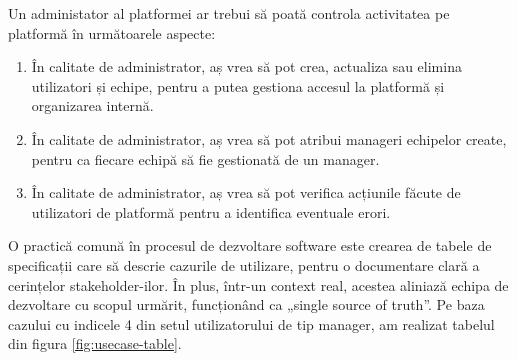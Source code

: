Un administator al platformei ar trebui să poată controla activitatea pe platformă în următoarele aspecte:
\begin{enumerate}
 	 \item  În calitate de administrator, aș vrea să pot crea, actualiza sau elimina utilizatori și echipe, pentru a putea gestiona accesul la platformă și organizarea internă.

 	 \item În calitate de administrator, aș vrea să pot atribui manageri echipelor create, pentru ca fiecare echipă să fie gestionată de un manager.

 	\item În calitate de administrator, aș vrea să pot verifica acțiunile făcute de utilizatori de platformă pentru a identifica eventuale erori.
\end{enumerate}

O practică comună în procesul de dezvoltare software este crearea de tabele de specificații care să descrie cazurile de utilizare, pentru o documentare clară a cerințelor stakeholder-ilor. În plus, într-un context real, acestea aliniază echipa de dezvoltare cu scopul urmărit, funcționând ca „single source of truth”. Pe baza cazului cu indicele 4 din setul utilizatorului de tip manager, am realizat tabelul din figura  \ref{fig:usecase-table}.

